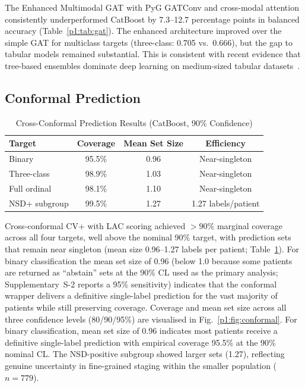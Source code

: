 The Enhanced Multimodal GAT with PyG GATConv and cross-modal attention consistently underperformed CatBoost by 7.3--12.7 percentage points in balanced accuracy (Table~\ref{p1:tab:gat}). The enhanced architecture improved over the simple GAT for multiclass targets (three-class: 0.705 vs.\ 0.666), but the gap to tabular models remained substantial. This is consistent with recent evidence that tree-based ensembles dominate deep learning on medium-sized tabular datasets~\cite{grinsztajn2022}.

\subsection{Conformal Prediction}

\begin{table}[!t]
\caption{Cross-Conformal Prediction Results (CatBoost, 90\% Confidence)}
\label{p1:tab:conformal}
\centering
\footnotesize
\begin{tabular}{@{}lccc@{}}
\toprule
\textbf{Target} & \textbf{Coverage} & \textbf{Mean Set Size} & \textbf{Efficiency} \\
\midrule
Binary & 95.5\% & 0.96 & Near-singleton \\
Three-class & 98.9\% & 1.03 & Near-singleton \\
Full ordinal & 98.1\% & 1.10 & Near-singleton \\
NSD+ subgroup & 99.5\% & 1.27 & 1.27 labels/patient \\
\bottomrule
\end{tabular}
\end{table}

Cross-conformal CV+ with LAC scoring achieved ${>}90\%$ marginal coverage across all four targets, well above the nominal 90\% target, with prediction sets that remain near singleton (mean size 0.96--1.27 labels per patient; Table~\ref{p1:tab:conformal}). For binary classification the mean set size of 0.96 (below 1.0 because some patients are returned as ``abstain'' sets at the 90\% CL used as the primary analysis; Supplementary~S-2 reports a 95\% sensitivity) indicates that the conformal wrapper delivers a definitive single-label prediction for the vast majority of patients while still preserving coverage. Coverage and mean set size across all three confidence levels (80/90/95\%) are visualised in Fig.~\ref{p1:fig:conformal}. For binary classification, mean set size of 0.96 indicates most patients receive a definitive single-label prediction with empirical coverage 95.5\% at the 90\% nominal CL. The NSD-positive subgroup showed larger sets (1.27), reflecting genuine uncertainty in fine-grained staging within the smaller population ($n{=}779$).


